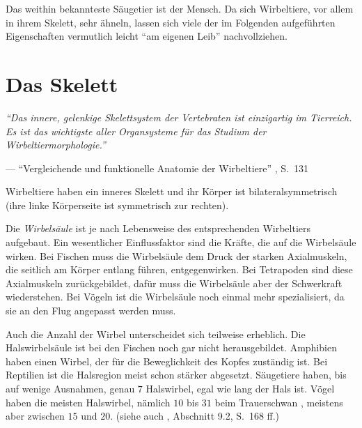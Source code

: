 Das weithin bekannteste Säugetier ist der Mensch. Da sich Wirbeltiere, vor allem in ihrem Skelett, sehr ähneln, lassen sich viele der im Folgenden aufgeführten Eigenschaften vermutlich leicht "`am eigenen Leib"' nachvollziehen.


\section{Das Skelett}
\label{biology_skeleton}

\vspace{0.5cm}
\begin{center}
 \begin{minipage}{12cm}
  \emph{"`Das innere, gelenkige Skelettsystem der Vertebraten ist einzigartig im Tierreich. Es ist das wichtigste aller Organsysteme für das Studium der Wirbeltiermorphologie."'}
 
  --- "`Vergleichende und funktionelle Anatomie der Wirbeltiere"' \cite{Vergleichende_Anatomie}, S.\ 131
 \end{minipage}
\end{center}

Wirbeltiere haben ein inneres Skelett und ihr Körper ist bilateralsymmetrisch (ihre linke Körperseite ist symmetrisch zur rechten). 

Die \emph{Wirbelsäule} ist je nach Lebensweise des entsprechenden Wirbeltiers aufgebaut. Ein wesentlicher Einflussfaktor sind die Kräfte, die auf die Wirbelsäule wirken. 
Bei Fischen muss die Wirbelsäule dem Druck der starken Axialmuskeln, die seitlich am Körper entlang führen, entgegenwirken.
Bei Tetrapoden sind diese Axialmuskeln zurückgebildet, dafür muss die Wirbelsäule aber der Schwerkraft wiederstehen.
Bei Vögeln ist die Wirbelsäule noch einmal mehr spezialisiert, da sie an den Flug angepasst werden muss.

Auch die Anzahl der Wirbel unterscheidet sich teilweise erheblich. 
Die Halswirbelsäule ist \zb bei den Fischen noch gar nicht herausgebildet. Amphibien haben einen Wirbel, der für die Beweglichkeit des Kopfes zuständig ist. Bei Reptilien ist die Halsregion meist schon stärker abgesetzt. Säugetiere haben, bis auf wenige Ausnahmen, genau $7$ Halswirbel, egal wie lang der Hals ist. Vögel haben die meisten Halswirbel, nämlich $10$ bis $31$ beim Trauerschwan \cite{WikipediaVogelskelett}, meistens aber zwischen $15$ und $20$. (siehe auch \cite{Vergleichende_Anatomie}, Abschnitt 9.2, S.\ 168 ff.)

